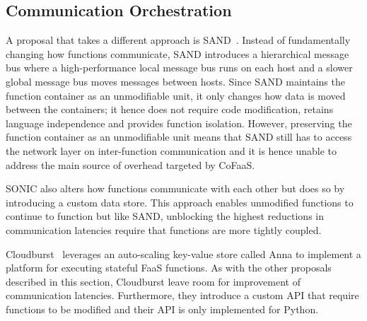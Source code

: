 \subsection{Communication Orchestration}
A proposal that takes a different approach is SAND~\cite{akkus18_sand}. Instead of fundamentally changing how functions communicate, SAND introduces a hierarchical message bus where a high-performance local message bus runs on each host and a slower global message bus moves messages between hosts. Since SAND maintains the function container as an unmodifiable unit, it only changes how data is moved between the containers; it hence does not require code modification, retains language independence and provides function isolation. However, preserving the function container as an unmodifiable unit means that SAND still has to access the network layer on inter-function communication and it is hence unable to address the main source of overhead targeted by CoFaaS.

SONIC \cite{mahgoub21_sonic} also alters how functions communicate with each other but does so by introducing a custom data store. This approach enables unmodified functions to continue to function but like SAND, unblocking the highest reductions in communication latencies require that functions are more tightly coupled.

Cloudburst~\cite{sreekanti20_cloud} leverages an auto-scaling key-value store called Anna to implement a platform for executing stateful FaaS functions. As with the other proposals described in this section, Cloudburst leave room for improvement of communication latencies. Furthermore, they introduce a custom API that require functions to be modified and their API is only implemented for Python.






